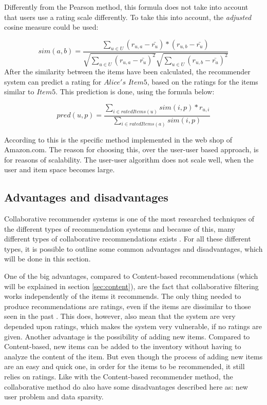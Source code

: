 Differently from the Pearson method, this formula does not take into account that users use a rating scale differently. To take this into account, the \textit{adjusted} cosine measure could be used:

\[
	sim(a,b) = \frac{\sum_{u \in U}(r_{u,a} - \bar{r_{u}})*(r_{u,b} - \bar{r_{u}})}{\sqrt{\sum_{u \in U}(r_{u,a} - \bar{r_{u}})^2}\sqrt{\sum_{u \in U} (r_{u,b} - \bar{r_{u}})^2}}
\]
After the similarity between the items have been calculated, the recommender system can predict a rating for \(Alice's\) \(Item5\), based on the ratings for the items similar to \(Item5\). This prediction is done, using the formula below:

\[
	pred(u,p) = \frac{\sum_{i\in ratedItems(u)} sim(i,p) * r_{u,i}}{\sum_{i \in ratedItems(a)} sim(i,p)}
\]

According to \citet{AmazonRecommendations} this is the specific method implemented in the web shop of Amazon.com. The reason for choosing this, over the user-user based approach, is for reasons of scalability. The user-user algorithm does not scale well, when the user and item space becomes large. 

\subsection{Advantages and disadvantages}
\label{subsec:collaborativeAdvantages}
Collaborative recommender systems is one of the most researched techniques of the different types of recommendation systems and because of this, many different types of collaborative recommendations exists \citep{IntroductionRecommenderSystems}. For all these different types, it is possible to outline some common advantages and disadvantages, which will be done in this section.\newline

One of the big advantages, compared to Content-based recommendations (which will be explained in section \ref{sec:content}), are the fact that collaborative filtering works independently of the items it recommends. The only thing needed to produce recommendations are ratings, even if the items are dissimilar to those seen in the past \citep[p. 18]{TowardsTheNextGenerationOfRs}. This does, however, also mean that the system are very depended upon ratings, which makes the system very vulnerable, if no ratings are given.\newline
Another advantage is the possibility of adding new items. Compared to Content-based, new items can be added to the inventory without having to analyze the content of the item. But even though the process of adding new items are an easy and quick one, in order for the items to be recommended, it still relies on ratings.\newline 
Like with the Content-based recommender method, the collaborative method do also have some disadvantages described here as: new user problem and data sparsity.\newline

